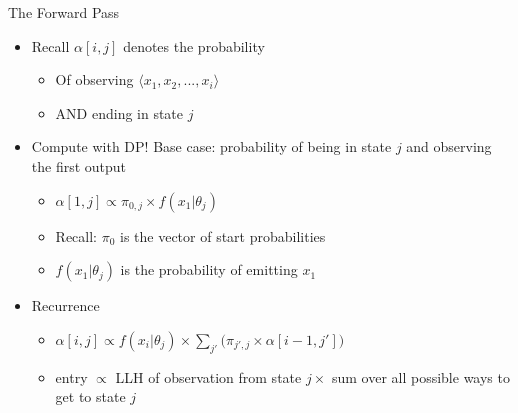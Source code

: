 \documentclass[aspectratio=169]{beamer}
\begin{document}
\begin{frame}{The Forward Pass}

\begin{itemize}
\item Recall $\alpha[i,j]$ denotes the probability
	\begin{itemize}
	\item Of observing $\langle x_1, x_2, ..., x_i \rangle$
	\item AND ending in state $j$
	\end{itemize}
\item Compute with DP! Base case: probability of being in state $j$ and observing the first output
        \begin{itemize}
        \item $\alpha[1,j] \propto \pi_{0,j} \times f(x_1 | \theta_j)$
        \item Recall: $\pi_0$ is the vector of start probabilities
        \item $f(x_1 | \theta_j)$ is the probability of emitting $x_1$
        \end{itemize}
\item Recurrence
	\begin{itemize}
	\item $\alpha[i,j] \propto f(x_i | \theta_j) \times \sum_{j'}\Big( \pi_{j',j} \times \alpha[i-1,j']\Big)$ 
	\item entry $\propto$ LLH of observation from state $j \times$ sum over all possible ways to get to state $j$
	\end{itemize}
\end{itemize}
\end{frame}
\end{document}
